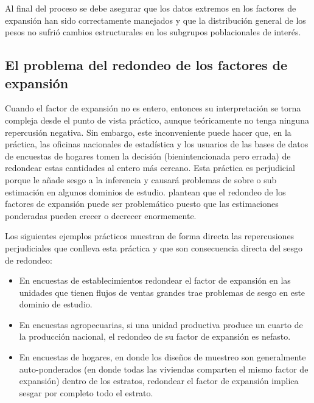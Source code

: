 \documentclass[
  12pt,
]{book}
\begin{document}
Al final del proceso se debe asegurar que los datos extremos en los factores de expansión han sido correctamente manejados y que la distribución general de los pesos no sufrió cambios estructurales en los subgrupos poblacionales de interés.

\hypertarget{el-problema-del-redondeo-de-los-factores-de-expansiuxf3n}{%
\subsection{El problema del redondeo de los factores de expansión}\label{el-problema-del-redondeo-de-los-factores-de-expansiuxf3n}}

Cuando el factor de expansión no es entero, entonces su interpretación se torna compleja desde el punto de vista práctico, aunque teóricamente no tenga ninguna repercusión negativa. Sin embargo, este inconveniente puede hacer que, en la práctica, las oficinas nacionales de estadística y los usuarios de las bases de datos de encuestas de hogares tomen la decisión (bienintencionada pero errada) de redondear estas cantidades al entero más cercano. Esta práctica es perjudicial porque le añade sesgo a la inferencia y causará problemas de sobre o sub estimación en algunos dominios de estudio. \citet{Sartore_Toppin_Young_Spiegelman_2019} plantean que el redondeo de los factores de expansión puede ser problemático puesto que las estimaciones ponderadas pueden crecer o decrecer enormemente.

Los siguientes ejemplos prácticos muestran de forma directa las repercusiones perjudiciales que conlleva esta práctica y que son consecuencia directa del sesgo de redondeo:

\begin{itemize}
\item
  En encuestas de establecimientos redondear el factor de expansión en las unidades que tienen flujos de ventas grandes trae problemas de sesgo en este dominio de estudio.
\item
  En encuestas agropecuarias, si una unidad productiva produce un cuarto de la producción nacional, el redondeo de su factor de expansión es nefasto.
\item
  En encuestas de hogares, en donde los diseños de muestreo son generalmente auto-ponderados (en donde todas las viviendas comparten el mismo factor de expansión) dentro de los estratos, redondear el factor de expansión implica sesgar por completo todo el estrato.
\end{itemize}
\end{document}
